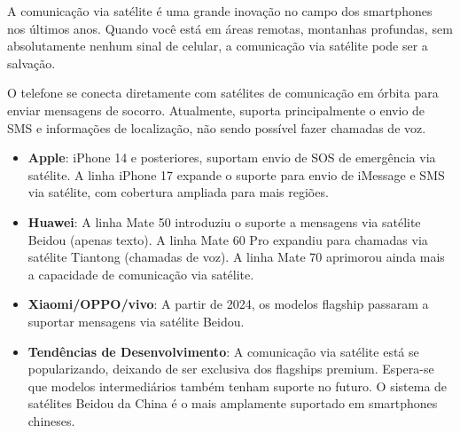 


A comunicação via satélite é uma grande inovação no campo dos smartphones nos últimos anos. Quando você está em áreas remotas, montanhas profundas, sem absolutamente nenhum sinal de celular, a comunicação via satélite pode ser a salvação.


O telefone se conecta diretamente com satélites de comunicação em órbita para enviar mensagens de socorro. Atualmente, suporta principalmente o envio de SMS e informações de localização, não sendo possível fazer chamadas de voz.


\begin{itemize}
  \item \textbf{Apple}: iPhone 14 e posteriores, suportam envio de SOS de emergência via satélite. A linha iPhone 17 expande o suporte para envio de iMessage e SMS via satélite, com cobertura ampliada para mais regiões.
  \item \textbf{Huawei}: A linha Mate 50 introduziu o suporte a mensagens via satélite Beidou (apenas texto). A linha Mate 60 Pro expandiu para chamadas via satélite Tiantong (chamadas de voz). A linha Mate 70 aprimorou ainda mais a capacidade de comunicação via satélite.
  \item \textbf{Xiaomi/OPPO/vivo}: A partir de 2024, os modelos flagship passaram a suportar mensagens via satélite Beidou.
  \item \textbf{Tendências de Desenvolvimento}: A comunicação via satélite está se popularizando, deixando de ser exclusiva dos flagships premium. Espera-se que modelos intermediários também tenham suporte no futuro. O sistema de satélites Beidou da China é o mais amplamente suportado em smartphones chineses.
\end{itemize}


